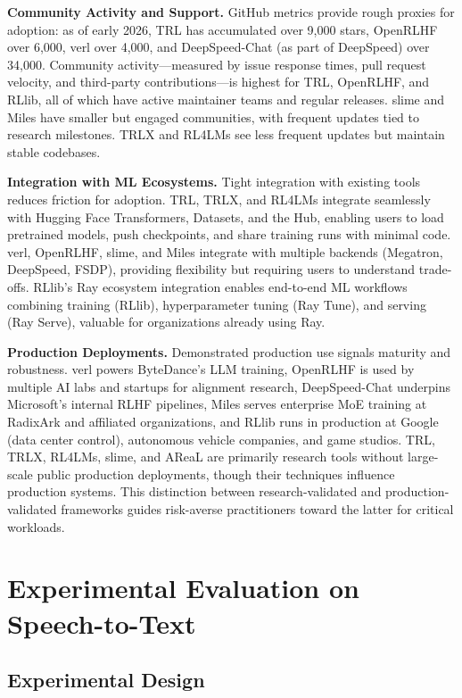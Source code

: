 \documentclass[conference]{IEEEtran}
\begin{document}
\textbf{Community Activity and Support.} GitHub metrics provide rough proxies for adoption: as of early 2026, TRL has accumulated over 9,000 stars, OpenRLHF over 6,000, verl over 4,000, and DeepSpeed-Chat (as part of DeepSpeed) over 34,000. Community activity—measured by issue response times, pull request velocity, and third-party contributions—is highest for TRL, OpenRLHF, and RLlib, all of which have active maintainer teams and regular releases. slime and Miles have smaller but engaged communities, with frequent updates tied to research milestones. TRLX and RL4LMs see less frequent updates but maintain stable codebases.

\textbf{Integration with ML Ecosystems.} Tight integration with existing tools reduces friction for adoption. TRL, TRLX, and RL4LMs integrate seamlessly with Hugging Face Transformers, Datasets, and the Hub, enabling users to load pretrained models, push checkpoints, and share training runs with minimal code. verl, OpenRLHF, slime, and Miles integrate with multiple backends (Megatron, DeepSpeed, FSDP), providing flexibility but requiring users to understand trade-offs. RLlib's Ray ecosystem integration enables end-to-end ML workflows combining training (RLlib), hyperparameter tuning (Ray Tune), and serving (Ray Serve), valuable for organizations already using Ray.

\textbf{Production Deployments.} Demonstrated production use signals maturity and robustness. verl powers ByteDance's LLM training, OpenRLHF is used by multiple AI labs and startups for alignment research, DeepSpeed-Chat underpins Microsoft's internal RLHF pipelines, Miles serves enterprise MoE training at RadixArk and affiliated organizations, and RLlib runs in production at Google (data center control), autonomous vehicle companies, and game studios. TRL, TRLX, RL4LMs, slime, and AReaL are primarily research tools without large-scale public production deployments, though their techniques influence production systems. This distinction between research-validated and production-validated frameworks guides risk-averse practitioners toward the latter for critical workloads.



\section{Experimental Evaluation on Speech-to-Text}

\subsection{Experimental Design}
\end{document}
